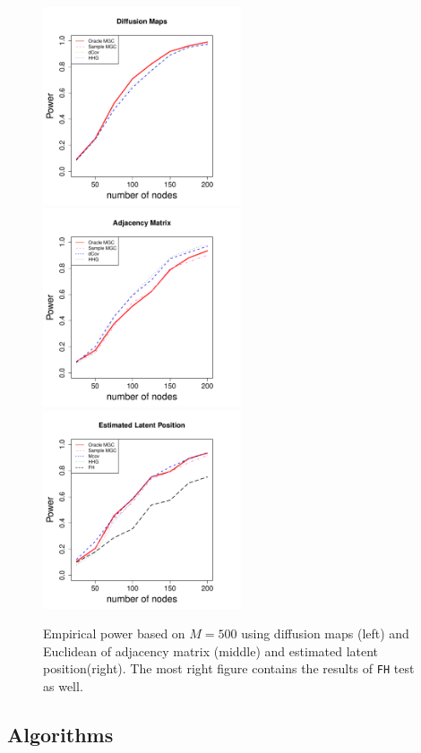 \documentclass[12pt]{article}
\theoremstyle{definition}
\begin{document}
\begin{figure}[H]
	\centering
	\includegraphics[width=2.3in]{../Figure/simplethree.pdf}
	\includegraphics[width=2.3in]{../Figure/Esimplethree.pdf}
	\includegraphics[width=2.3in]{../Figure/Fsimplethree.pdf}
	\caption{Empirical power based on $M = 500$ using diffusion maps (left) and Euclidean of adjacency matrix (middle)  and estimated latent position(right). The most right figure contains the results of \texttt{FH} test as well.}
		\label{fig:threeSBM}
\end{figure}
\newpage
\subsection{Algorithms}
\end{document}

